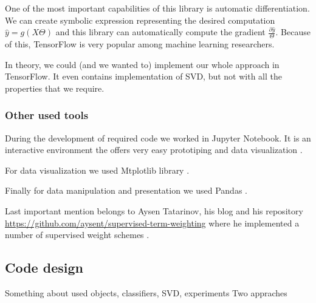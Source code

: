     One of the most important capabilities of this library is automatic differentiation.
    We can create symbolic expression representing the desired computation $\hat{y}=g(X\Theta)$ and this library can automatically compute the gradient $\frac{\partial \hat{y}}{\Theta}$.
    Because of this, TensorFlow is very popular among  machine learning researchers.
    
    In theory, we could (and we wanted to) implement our whole approach in TensorFlow.
    It even contains implementation of SVD, but not with all the properties that we require.
    
    \subsubsection{Other used tools}
    
    During the development of required code we worked in Jupyter Notebook. 
    It is an interactive environment the offers very easy prototiping and
    data visualization \cite{PER-GRA:2007}. %
    
    For data visualization we used Mtplotlib library \cite{hunter2007matplotlib}. %
    
    Finally for data manipulation and presentation we used Pandas \cite{mckinney2010data}. %
    
    Last important mention belongs to Aysen Tatarinov, his blog and his repository \url{https://github.com/aysent/supervised-term-weighting} where he implemented a number of supervised weight schemes \cite{maas2011learning}.
    \* %
    
    \subsection{Code design} 
    
    \*
    Something about used objects, classifiers, SVD, experiments
    Two appraches